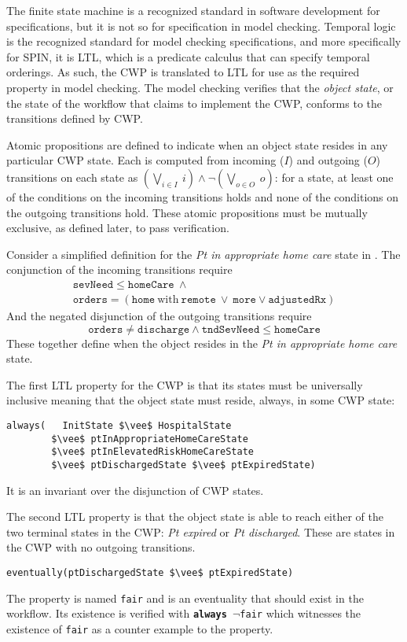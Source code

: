 The finite state machine is a recognized standard in software development for specifications, but it is not so for specification in model checking.
Temporal logic is the recognized standard for model checking specifications, and more specifically for SPIN, it is LTL, which is a predicate calculus that can specify temporal orderings.
As such, the CWP is translated to LTL for use as the required property in model checking.
The model checking verifies that the \emph{object state}, or the state of the workflow that claims to implement the CWP, conforms to the transitions defined by CWP.

Atomic propositions are defined to indicate when an object state resides in any particular CWP state.
Each is computed from incoming ($I$) and outgoing ($O$) transitions on each state as $(\bigvee_{i \in I}\ i) \wedge \neg(\bigvee_{o \in O}\ o)$: for a state, at least one of the conditions on the incoming transitions holds and none of the conditions on the outgoing transitions hold.
These atomic propositions must be mutually exclusive, as defined later, to pass verification.

Consider a simplified definition for the \emph{Pt in appropriate home care} state in . The conjunction of the incoming transitions require
%
\[
\begin{array}{l}
  \mathtt{sevNeed} \le \mathtt{homeCare}\ \wedge\ \\
  \mathtt{orders} = (\mathtt{home}\ \mathrm{with}\ \mathtt{remote}\ \vee\ 
                    \mathtt{more} \vee \mathtt{adjustedRx})
\end{array}
\]
%
And the negated disjunction of the outgoing transitions require
%
\[
  \mathtt{orders} \neq \mathtt{discharge} \wedge \mathtt{tndSevNeed} \le \mathtt{homeCare}
\]
%
\noindent These together define when the object resides in the \emph{Pt in appropriate home care} state.

The first LTL property for the CWP is that its states must be universally inclusive meaning that the object state must reside, always, in some CWP state:
%
{\small
\begin{lstlisting}[style=myPromela,mathescape=true]
always(   InitState $\vee$ HospitalState 
        $\vee$ ptInAppropriateHomeCareState 
        $\vee$ ptInElevatedRiskHomeCareState 
        $\vee$ ptDischargedState $\vee$ ptExpiredState)
\end{lstlisting}
}
%
\noindent It is an invariant over the disjunction of CWP states.

The second LTL property is that the object state is able to reach either of the two terminal states in the CWP: \emph{Pt expired} or \emph{Pt discharged}.
These are states in the CWP with no outgoing transitions.
%
{\small
\begin{lstlisting}[style=myPromela,mathescape=true]
eventually(ptDischargedState $\vee$ ptExpiredState)
\end{lstlisting}
}
%
\noindent The property is named \texttt{fair} and is an eventuality that should exist in the workflow.
Its existence is verified with \texttt{\textbf{always} $\neg$fair} which witnesses the existence of \texttt{fair} as a counter example to the property.

